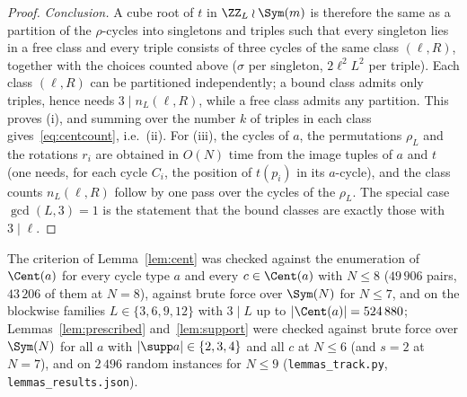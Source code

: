 \begin{proof}
\emph{Conclusion.} A cube root of $t$ in $\ZZ_L\wr\Sym(m)$ is therefore the same as a partition of the $\rho$-cycles into singletons and triples such that every singleton lies in a free class and every triple consists of three cycles of the same class $(\ell,R)$, together with the choices counted above ($\sigma$ per singleton, $2\ell^{2}L^{2}$ per triple). Each class $(\ell,R)$ can be partitioned independently; a bound class admits only triples, hence needs $3\mid n_L(\ell,R)$, while a free class admits any partition. This proves (i), and summing over the number $k$ of triples in each class gives~\eqref{eq:centcount}, i.e.\ (ii). For (iii), the cycles of $a$, the permutations $\rho_L$ and the rotations $r_i$ are obtained in $O(N)$ time from the image tuples of $a$ and $t$ (one needs, for each cycle $C_i$, the position of $t(p_i)$ in its $a$-cycle), and the class counts $n_L(\ell,R)$ follow by one pass over the cycles of the $\rho_L$. The special case $\gcd(L,3)=1$ is the statement that the bound classes are exactly those with $3\mid\ell$.
\end{proof}
\begin{rem}
The criterion of Lemma~\ref{lem:cent} was checked against the enumeration of $\Cent(a)$ for every cycle type $a$ and every $c\in\Cent(a)$ with $N\le8$ ($49\,906$ pairs, $43\,206$ of them at $N=8$), against brute force over $\Sym(N)$ for $N\le7$, and on the blockwise families $L\in\{3,6,9,12\}$ with $3\mid L$ up to $|\Cent(a)|=524\,880$; Lemmas~\ref{lem:prescribed} and~\ref{lem:support} were checked against brute force over $\Sym(N)$ for all $a$ with $|\supp a|\in\{2,3,4\}$ and all $c$ at $N\le6$ (and $s=2$ at $N=7$), and on $2\,496$ random instances for $N\le9$ (\texttt{lemmas\_track.py}, \texttt{lemmas\_results.json}).
\end{rem}
